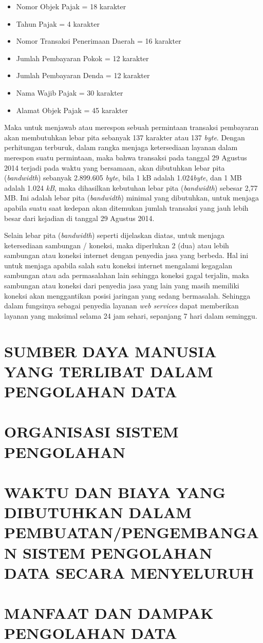 \documentclass[pdftex,12pt, oneside]{article}
\begin{document}
\begin{enumerate}
\begin{itemize}
  \item Nomor Objek Pajak = 18 karakter
  \item Tahun Pajak = 4 karakter
  \item Nomor Transaksi Penerimaan Daerah = 16 karakter
  \item Jumlah Pembayaran Pokok = 12 karakter
  \item Jumlah Pembayaran Denda = 12 karakter
  \item Nama Wajib Pajak = 30 karakter
  \item Alamat Objek Pajak = 45 karakter
\end{itemize}

Maka untuk menjawab atau merespon sebuah permintaan transaksi pembayaran akan membutuhkan lebar pita sebanyak 137 karakter atau 137 \textit{byte}. Dengan perhitungan terburuk, dalam rangka menjaga ketersediaan layanan dalam merespon suatu permintaan, maka bahwa transaksi pada tanggal 29 Agustus 2014 terjadi pada waktu yang bersamaan, akan dibutuhkan lebar pita (\textit{bandwidth}) sebanyak 2.899.605 \textit{byte}, bila 1 kB adalah 1.024\textit{byte}, dan 1 MB adalah 1.024 \textit{kB}, maka dihasilkan kebutuhan lebar pita (\textit{bandwidth}) sebesar 2,77 MB. Ini adalah lebar pita (\textit{bandwidth}) minimal yang dibutuhkan, untuk menjaga apabila suatu saat kedepan akan ditemukan jumlah transaksi yang jauh lebih besar dari kejadian di tanggal 29 Agustus 2014.

Selain lebar pita (\textit{bandwidth}) seperti dijelaskan diatas, untuk menjaga ketersediaan sambungan / koneksi, maka diperlukan 2 (dua) atau lebih sambungan atau koneksi internet dengan penyedia jasa yang berbeda. Hal ini untuk menjaga apabila salah satu koneksi internet mengalami kegagalan sambungan atau ada permasalahan lain sehingga koneksi gagal terjalin, maka sambungan atau koneksi dari penyedia jasa yang lain yang masih memiliki koneksi akan menggantikan posisi jaringan yang sedang bermasalah. Sehingga dalam fungsinya sebagai penyedia layanan \textit{web services} dapat memberikan layanan yang maksimal selama 24 jam sehari, sepanjang 7 hari dalam seminggu.

\end{enumerate}


\section{SUMBER DAYA MANUSIA YANG TERLIBAT DALAM PENGOLAHAN DATA}


\section{ORGANISASI SISTEM PENGOLAHAN}


\section{WAKTU DAN BIAYA YANG DIBUTUHKAN DALAM PEMBUATAN/PENGEMBANGAN SISTEM PENGOLAHAN DATA SECARA MENYELURUH}


\section{MANFAAT DAN DAMPAK PENGOLAHAN DATA}
\end{document}
